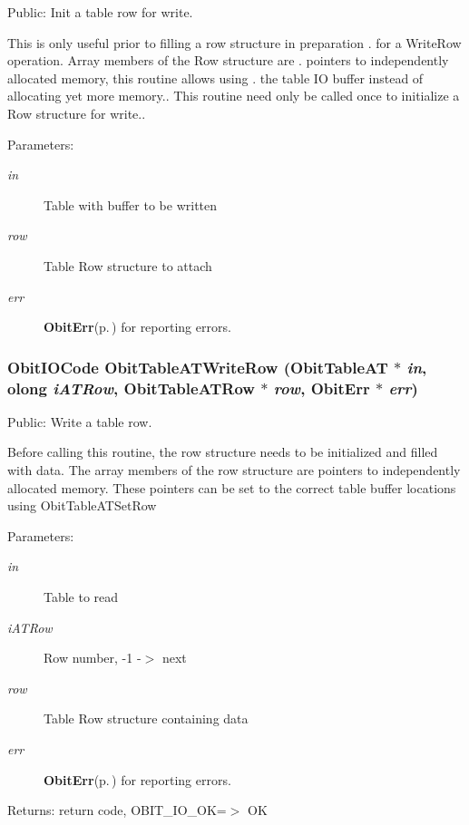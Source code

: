 Public: Init a table row for write. 

This is only useful prior to filling a row structure in preparation . for a Write\-Row operation. Array members of the Row structure are . pointers to independently allocated memory, this routine allows using . the table IO buffer instead of allocating yet more memory.. This routine need only be called once to initialize a Row structure for write.. \begin{Desc}
\item[Parameters:]
\begin{description}
\item[{\em in}]Table with buffer to be written \item[{\em row}]Table Row structure to attach \item[{\em err}]{\bf Obit\-Err}{\rm (p.\,\pageref{structObitErr})} for reporting errors. \end{description}
\end{Desc}
\subsubsection{\setlength{\rightskip}{0pt plus 5cm}Obit\-IOCode Obit\-Table\-ATWrite\-Row ({\bf Obit\-Table\-AT} $\ast$ {\em in}, {\bf olong} {\em i\-ATRow}, {\bf Obit\-Table\-ATRow} $\ast$ {\em row}, {\bf Obit\-Err} $\ast$ {\em err})}\label{ObitTableAT_8h_a20}


Public: Write a table row. 

Before calling this routine, the row structure needs to be initialized and filled with data. The array members of the row structure are pointers to independently allocated memory. These pointers can be set to the correct table buffer locations using Obit\-Table\-ATSet\-Row \begin{Desc}
\item[Parameters:]
\begin{description}
\item[{\em in}]Table to read \item[{\em i\-ATRow}]Row number, -1 -$>$ next \item[{\em row}]Table Row structure containing data \item[{\em err}]{\bf Obit\-Err}{\rm (p.\,\pageref{structObitErr})} for reporting errors. \end{description}
\end{Desc}
\begin{Desc}
\item[Returns:]return code, OBIT\_\-IO\_\-OK=$>$ OK \end{Desc}
